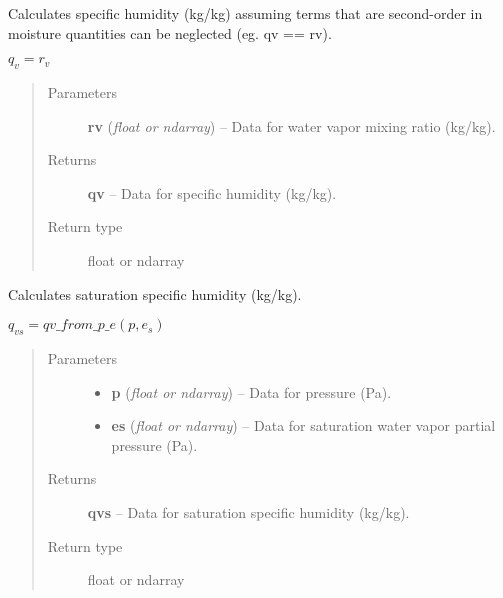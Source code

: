 \documentclass[letterpaper,10pt,english]{sphinxmanual}
\begin{document}

\begin{fulllineitems}
\label{atmos:atmos.equations.qv_from_rv_lwv}
Calculates specific humidity (kg/kg) assuming terms that are second-order in
moisture quantities can be neglected (eg. qv == rv).

\(q_v = r_v\)
\begin{quote}\begin{description}
\item[{Parameters}] \leavevmode
\textbf{rv} (\emph{float or ndarray}) -- Data for water vapor mixing ratio (kg/kg).

\item[{Returns}] \leavevmode
\textbf{qv} --
Data for specific humidity (kg/kg).

\item[{Return type}] \leavevmode
float or ndarray

\end{description}\end{quote}

\end{fulllineitems}


\begin{fulllineitems}
\label{atmos:atmos.equations.qvs_from_p_es}
Calculates saturation specific humidity (kg/kg).

\(q_{vs} = qv\_from\_p\_e(p, e_s)\)
\begin{quote}\begin{description}
\item[{Parameters}] \leavevmode\begin{itemize}
\item {} 
\textbf{p} (\emph{float or ndarray}) -- Data for pressure (Pa).

\item {} 
\textbf{es} (\emph{float or ndarray}) -- Data for saturation water vapor partial pressure (Pa).

\end{itemize}

\item[{Returns}] \leavevmode
\textbf{qvs} --
Data for saturation specific humidity (kg/kg).

\item[{Return type}] \leavevmode
float or ndarray

\end{description}\end{quote}

\end{fulllineitems}
\end{document}
